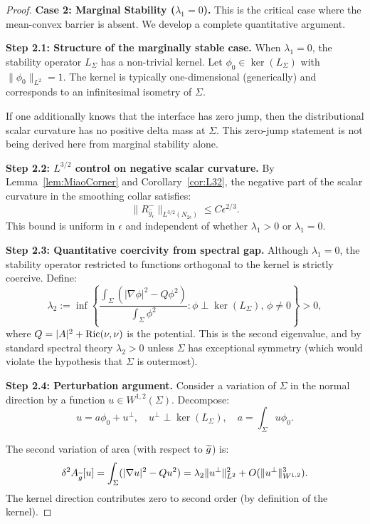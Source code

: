 \begin{proof}
\textbf{Case 2: Marginal Stability ($\lambda_1 = 0$).}
This is the critical case where the mean-convex barrier is absent. We develop a complete quantitative argument.

\textbf{Step 2.1: Structure of the marginally stable case.}
When $\lambda_1 = 0$, the stability operator $L_\Sigma$ has a non-trivial kernel. Let $\phi_0 \in \ker(L_\Sigma)$ with $\|\phi_0\|_{L^2} = 1$. The kernel is typically one-dimensional (generically) and corresponds to an infinitesimal isometry of $\Sigma$.

If one additionally knows that the interface has zero jump, then the distributional scalar curvature has no positive delta mass at $\Sigma$. This zero-jump statement is not being derived here from marginal stability alone.

\textbf{Step 2.2: $L^{3/2}$ control on negative scalar curvature.}
By Lemma~\ref{lem:MiaoCorner} and Corollary~\ref{cor:L32}, the negative part of the scalar curvature in the smoothing collar satisfies:
\begin{equation}\label{eq:L32NegativePartProof}
    \|R^-_{\hat{g}_\epsilon}\|_{L^{3/2}(N_{2\epsilon})} \le C \epsilon^{2/3}.
\end{equation}
This bound is uniform in $\epsilon$ and independent of whether $\lambda_1 > 0$ or $\lambda_1 = 0$.

\textbf{Step 2.3: Quantitative coercivity from spectral gap.}
Although $\lambda_1 = 0$, the stability operator restricted to functions orthogonal to the kernel is strictly coercive. Define:
\begin{equation}
    \lambda_2 := \inf \left\{ \frac{\int_\Sigma (|\nabla \phi|^2 - Q \phi^2)}{\int_\Sigma \phi^2} : \phi \perp \ker(L_\Sigma), \, \phi \ne 0 \right\} > 0,
\end{equation}
where $Q = |A|^2 + \mathrm{Ric}(\nu,\nu)$ is the potential. This is the second eigenvalue, and by standard spectral theory $\lambda_2 > 0$ unless $\Sigma$ has exceptional symmetry (which would violate the hypothesis that $\Sigma$ is outermost).

\textbf{Step 2.4: Perturbation argument.}
Consider a variation of $\Sigma$ in the normal direction by a function $u \in W^{1,2}(\Sigma)$. Decompose:
\begin{equation}
    u = a \phi_0 + u^\perp, \quad u^\perp \perp \ker(L_\Sigma), \quad a = \int_\Sigma u \phi_0.
\end{equation}

The second variation of area (with respect to $\widetilde{g}$) is:
\begin{equation}
    \delta^2 A_{\widetilde{g}}[u] = \int_\Sigma (|\nabla u|^2 - Q u^2) = \lambda_2 \|u^\perp\|_{L^2}^2 + O(\|u^\perp\|_{W^{1,2}}^3).
\end{equation}
The kernel direction contributes zero to second order (by definition of the kernel).


\end{proof}
